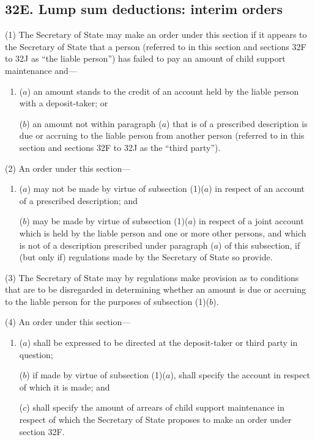 \documentclass[a4paper]{article}
\begin{document}
\subsection{32E. Lump sum deductions: interim orders}

(1) The Secretary of State may make an order under this section if it appears to the Secretary of State that a person (referred to in this section and sections 32F to 32J as “the liable person”) has failed to pay an amount of child support maintenance and---
\begin{enumerate}\item[]
($a$) an amount stands to the credit of an account held by the liable person with a deposit-taker; or

($b$) an amount not within paragraph ($a$) that is of a prescribed description is due or accruing to the liable person from another person (referred to in this section and sections 32F to 32J as the “third party”).
\end{enumerate}

(2) An order under this section---
\begin{enumerate}\item[]
($a$) may not be made by virtue of subsection (1)($a$) in respect of an account of a prescribed description; and

($b$) may be made by virtue of subsection (1)($a$) in respect of a joint account which is held by the liable person and one or more other persons, and which is not of a description prescribed under paragraph ($a$) of this subsection, if (but only if) regulations made by the Secretary of State so provide.
\end{enumerate}

(3)
The Secretary of State may by regulations make provision as to conditions that are to be disregarded in determining whether an amount is due or accruing to the liable person for the purposes of subsection (1)($b$).

(4)
An order under this section---
\begin{enumerate}\item[]
($a$) shall be expressed to be directed at the deposit-taker or third party in question;

($b$) if made by virtue of subsection (1)($a$), shall specify the account in respect of which it is made; and

($c$) shall specify the amount of arrears of child support maintenance in respect of which the Secretary of State proposes to make an order under section 32F.
\end{enumerate}
\end{document}
